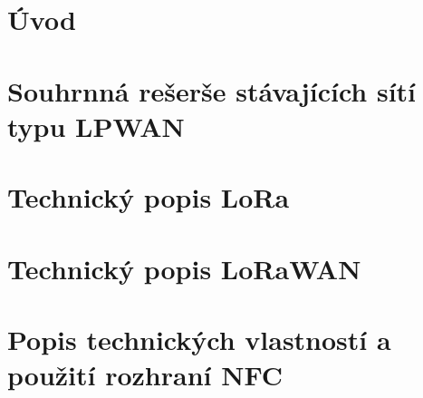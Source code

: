 \documentclass[czech,bachelor]{diploma}
\begin{document}
\MakeTitlePages


\listoffigures
\clearpage

\listoftables
\clearpage

\chapter{Úvod}



\chapter{Souhrnná rešerše stávajících sítí typu LPWAN}



\chapter{Technický popis LoRa}



\chapter{Technický popis LoRaWAN}



\chapter{Popis technických vlastností a použití rozhraní NFC}



\printbibliography[title={Literatura}, heading=bibintoc]
\end{document}
